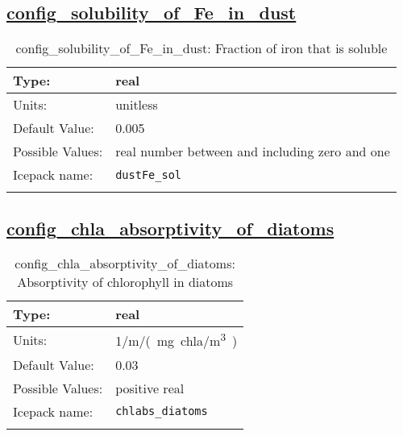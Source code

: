 \subsection[config\_solubility\_of\_Fe\_in\_dust]{\hyperref[sec:nm_tab_biogeochemistry]{config\_solubility\_of\_Fe\_in\_dust}}
\label{subsec:nm_sec_config_solubility_of_Fe_in_dust}
\begin{center}
\begin{longtable}{| p{2.0in} || p{4.0in} |}
    \hline
    Type: & real \\
    \hline
    Units: & \si{unitless} \\
    \hline
    Default Value: & 0.005 \\
    \hline
    Possible Values: & real number between and including zero and one \\
    \hline
    \hline
    Icepack name: & \verb+dustFe_sol+ \\
    \caption{config\_solubility\_of\_Fe\_in\_dust: Fraction of iron that is soluble}
\end{longtable}
\end{center}
\subsection[config\_chla\_absorptivity\_of\_diatoms]{\hyperref[sec:nm_tab_biogeochemistry]{config\_chla\_absorptivity\_of\_diatoms}}
\label{subsec:nm_sec_config_chla_absorptivity_of_diatoms}
\begin{center}
\begin{longtable}{| p{2.0in} || p{4.0in} |}
    \hline
    Type: & real \\
    \hline
    Units: & \si{1/m/(mg.chla/m^3)} \\
    \hline
    Default Value: & 0.03 \\
    \hline
    Possible Values: & positive real \\
    \hline
    \hline
    Icepack name: & \verb+chlabs_diatoms+ \\
    \caption{config\_chla\_absorptivity\_of\_diatoms: Absorptivity of chlorophyll in diatoms}
\end{longtable}
\end{center}
